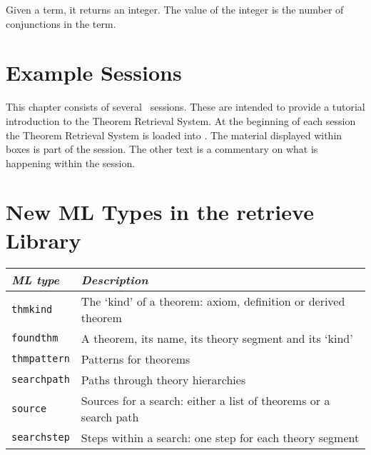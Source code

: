 \noindent
Given a term, it returns an integer. The value of the integer is the number of
conjunctions in the term.


\chapter{Example Sessions}

This chapter consists of several \HOL\ sessions. These are intended to provide
a tutorial introduction to the Theorem Retrieval System. At the beginning of
each session the Theorem Retrieval System is loaded into \HOL. The material
displayed within boxes is part of the session. The other text is a commentary
on what is happening within the session.









\chapter{New ML Types in the retrieve Library}

{\def\_{{\char'137}}                     %

\begin{center}
\begin{tabular}{|l|l|}
\hline
{\it ML type}                 & {\it Description}\\
\hline
{\small\tt thmkind}           & The `kind' of a theorem: axiom, definition or
derived theorem \\
{\small\tt foundthm}          & A theorem, its name, its theory segment and its
`kind' \\
{\small\tt thmpattern}        & Patterns for theorems \\
{\small\tt searchpath}        & Paths through theory hierarchies \\
{\small\tt source}            & Sources for a search: either a list of theorems
or a search path \\
{\small\tt searchstep}        & Steps within a search: one step for each theory
segment \\
\hline
\end{tabular}
\end{center}

}
